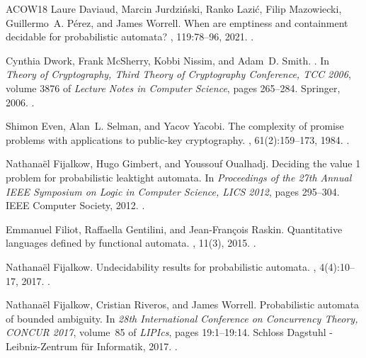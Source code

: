 \documentclass[10pt,a4paper]{amsart}
\numberwithin{equation}{section}
\theoremstyle{plain}
\theoremstyle{definition}
\theoremstyle{remark}
\begin{document}
\begin{thebibliography}{ACOW18}
Laure Daviaud, Marcin Jurdzi\'{n}ski, Ranko Lazi\'{c}, Filip Mazowiecki,
  Guillermo~A. P{\'{e}}rez, and James Worrell.
\newblock When are emptiness and containment decidable for probabilistic
  automata?
, 119:78--96, 2021.
\newblock \href {https://doi.org/10.1016/j.jcss.2021.01.006}
  {}.

Cynthia Dwork, Frank McSherry, Kobbi Nissim, and Adam~D. Smith.
.
\newblock In {\em Theory of Cryptography, Third Theory of Cryptography
  Conference, {TCC} 2006}, volume 3876 of {\em Lecture Notes in Computer
  Science}, pages 265--284. Springer, 2006.
\newblock \href {https://doi.org/10.1007/11681878_14}
  {}.

Shimon Even, Alan~L. Selman, and Yacov Yacobi.
\newblock The complexity of promise problems with applications to public-key
  cryptography.
, 61(2):159--173, 1984.
\newblock \href {https://doi.org/10.1016/S0019-9958(84)80056-X}
  {}.

Nathana{\"{e}}l Fijalkow, Hugo Gimbert, and Youssouf Oualhadj.
\newblock Deciding the value 1 problem for probabilistic leaktight automata.
\newblock In {\em Proceedings of the 27th Annual {IEEE} Symposium on Logic in
  Computer Science, {LICS} 2012}, pages 295--304. {IEEE} Computer Society,
  2012.
\newblock \href {https://doi.org/10.1109/LICS.2012.40}
  {}.

Emmanuel Filiot, Raffaella Gentilini, and Jean{-}Fran{\c{c}}ois Raskin.
\newblock Quantitative languages defined by functional automata.
, 11(3), 2015.
\newblock \href {https://doi.org/10.2168/LMCS-11(3:14)2015}
  {}.

Nathana{\"{e}}l Fijalkow.
\newblock Undecidability results for probabilistic automata.
, 4(4):10--17, 2017.
\newblock \href {https://doi.org/10.1145/3157831.3157833}
  {}.

Nathana{\"{e}}l Fijalkow, Cristian Riveros, and James Worrell.
\newblock Probabilistic automata of bounded ambiguity.
\newblock In {\em 28th International Conference on Concurrency Theory, {CONCUR}
  2017}, volume~85 of {\em LIPIcs}, pages 19:1--19:14. Schloss Dagstuhl -
  Leibniz-Zentrum f{\"{u}}r Informatik, 2017.
\newblock \href {https://doi.org/10.4230/LIPIcs.CONCUR.2017.19}
  {}.


\end{thebibliography}
\end{document}
